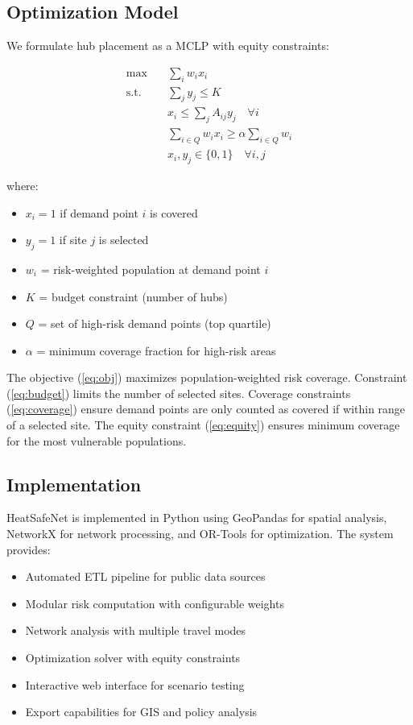 \documentclass[conference]{IEEEtran}
\begin{document}
\subsection{Optimization Model}

We formulate hub placement as a MCLP with equity constraints:

\begin{align}
\max \quad & \sum_i w_i x_i \label{eq:obj} \\
\text{s.t.} \quad & \sum_j y_j \leq K \label{eq:budget} \\
& x_i \leq \sum_j A_{ij} y_j \quad \forall i \label{eq:coverage} \\
& \sum_{i \in Q} w_i x_i \geq \alpha \sum_{i \in Q} w_i \label{eq:equity} \\
& x_i, y_j \in \{0,1\} \quad \forall i,j \label{eq:binary}
\end{align}

where:
\begin{itemize}
\item $x_i = 1$ if demand point $i$ is covered
\item $y_j = 1$ if site $j$ is selected
\item $w_i$ = risk-weighted population at demand point $i$
\item $K$ = budget constraint (number of hubs)
\item $Q$ = set of high-risk demand points (top quartile)
\item $\alpha$ = minimum coverage fraction for high-risk areas
\end{itemize}

The objective (\ref{eq:obj}) maximizes population-weighted risk coverage. Constraint (\ref{eq:budget}) limits the number of selected sites. Coverage constraints (\ref{eq:coverage}) ensure demand points are only counted as covered if within range of a selected site. The equity constraint (\ref{eq:equity}) ensures minimum coverage for the most vulnerable populations.

\subsection{Implementation}

HeatSafeNet is implemented in Python using GeoPandas for spatial analysis, NetworkX for network processing, and OR-Tools for optimization. The system provides:

\begin{itemize}
\item Automated ETL pipeline for public data sources
\item Modular risk computation with configurable weights
\item Network analysis with multiple travel modes
\item Optimization solver with equity constraints
\item Interactive web interface for scenario testing
\item Export capabilities for GIS and policy analysis
\end{itemize}
\end{document}
